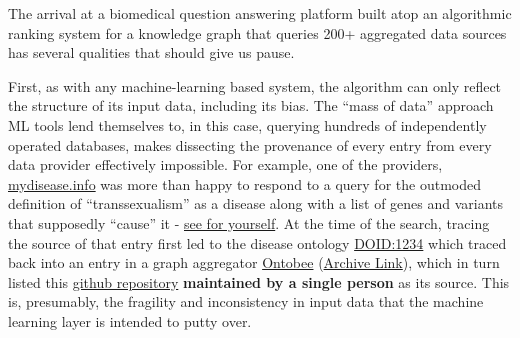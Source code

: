 The arrival at a biomedical question answering platform built atop an
algorithmic ranking system for a knowledge graph that queries 200+
aggregated data sources has several qualities that should give us pause.

First, as with any machine-learning based system, the algorithm can only
reflect the structure of its input data, including its bias. The ``mass
of data'' approach ML tools lend themselves to, in this case, querying
hundreds of independently operated databases, makes dissecting the
provenance of every entry from every data provider effectively
impossible. For example, one of the providers,
\href{https://mydisease.info}{mydisease.info} was more than happy to
respond to a query for the outmoded definition of ``transsexualism'' as
a disease \citep{ramTransphobiaEncodedExamination2021}  along with
a list of genes and variants that supposedly ``cause'' it -
\href{http://mydisease.info/v1/query?q=\%22DOID\%3A10919\%22}{see for
yourself}. At the time of the search, tracing the source of that entry
first led to the disease ontology
\href{https://web.archive.org/web/20211007053446/https://www.ebi.ac.uk/ols/ontologies/doid/terms?iri=http\%3A\%2F\%2Fpurl.obolibrary.org\%2Fobo\%2FDOID_1234}{DOID:1234}
which traced back into an entry in a graph aggregator
\href{http://www.ontobee.org/ontology/DOID?iri=http://purl.obolibrary.org/obo/DOID_1234}{Ontobee}
(\href{https://web.archive.org/web/20210923110103/http://www.ontobee.org/ontology/DOID?iri=http://purl.obolibrary.org/obo/DOID_1234}{Archive
Link}), which in turn listed this
\href{https://github.com/jannahastings/mental-functioning-ontology}{github
repository} \textbf{maintained by a single person} as its
source. This is, presumably, the fragility
and inconsistency in input data that the machine learning layer is
intended to putty over.

